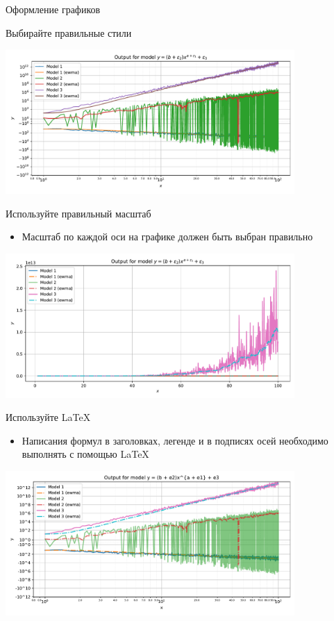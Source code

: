 \documentclass[fleqn, xcolor=x11names]{beamer}
\begin{document}
\begin{section}{Оформление графиков}
\begin{frame}{Выбирайте правильные стили}
	\begin{center}
		\includegraphics[height=5.5cm]{bad_plots/non_optimal_style_plot.pdf}
	\end{center}
\end{frame}

\begin{frame}{Используйте правильный масштаб}
    \begin{itemize}
        \item Масштаб по каждой оси на графике должен быть выбран правильно
    \end{itemize}

	\begin{center}
		\includegraphics[height=5.5cm]{bad_plots/no_scaling_plot.pdf}
	\end{center}
\end{frame}

\begin{frame}{Используйте \LaTeX}
    \begin{itemize}
        \item Написания формул в заголовках, легенде и в подписях осей необходимо выполнять с помощью \LaTeX
    \end{itemize}

	\begin{center}
		\includegraphics[height=5.5cm]{bad_plots/no_latex_plot.pdf}
	\end{center}
\end{frame}


\end{section}
\end{document}
